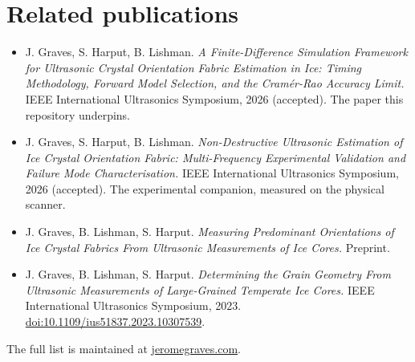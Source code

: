 \chapter*{Related publications}

\begin{itemize}
  \item J. Graves, S. Harput, B. Lishman.
    \emph{A Finite-Difference Simulation Framework for Ultrasonic
    Crystal Orientation Fabric Estimation in Ice: Timing Methodology,
    Forward Model Selection, and the Cram\'er-Rao Accuracy Limit.}
    IEEE International Ultrasonics Symposium, 2026 (accepted). The
    paper this repository underpins.
  \item J. Graves, S. Harput, B. Lishman.
    \emph{Non-Destructive Ultrasonic Estimation of Ice Crystal
    Orientation Fabric: Multi-Frequency Experimental Validation and
    Failure Mode Characterisation.} IEEE International Ultrasonics
    Symposium, 2026 (accepted). The experimental companion, measured
    on the physical scanner.
  \item J. Graves, B. Lishman, S. Harput.
    \emph{Measuring Predominant Orientations of Ice Crystal Fabrics
    From Ultrasonic Measurements of Ice Cores.} Preprint.
  \item J. Graves, B. Lishman, S. Harput.
    \emph{Determining the Grain Geometry From Ultrasonic Measurements
    of Large-Grained Temperate Ice Cores.} IEEE International
    Ultrasonics Symposium, 2023.
    \href{https://doi.org/10.1109/ius51837.2023.10307539}{doi:10.1109/ius51837.2023.10307539}.
\end{itemize}

The full list is maintained at
\href{https://jeromegraves.com/\#publications}{jeromegraves.com}.
